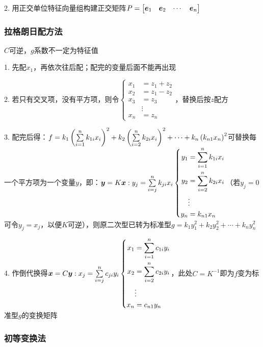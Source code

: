 \documentclass{article}
\begin{document}
2. 用正交单位特征向量组构建正交矩阵$P=\begin{bmatrix}\boldsymbol e_1&\boldsymbol e_2&\cdots&\boldsymbol e_n\end{bmatrix}$

\subsubsection{拉格朗日配方法}

$C$可逆，$g$系数不一定为特征值

1. 先配$x_1$，再依次往后配；配完的变量后面不能再出现

2. 若只有交叉项，没有平方项，则令$\left\{\begin{aligned}
        x_1 & =z_1+z_2 \\
        x_2 & =z_1-z_2 \\
        x_3 & =z_3     \\
            & \vdots   \\
        x_n & =z_n
    \end{aligned}\right.$，替换后按$z$配方

3. 配完后得：$f=k_1\left(\sum\limits_{i=1}^nk_{1i}x_i\right)^2+
    k_2\left(\sum\limits_{i=2}^nk_{2i}x_i\right)^2+\cdots+
    k_n\left(k_{n1}x_n\right)^2$可替换每一个平方项为一个变量$y$，即：$\boldsymbol y=K\boldsymbol x:y_j=\sum\limits_{i=j}^nk_{ji}x_i\left\{\begin{aligned}
        y_1 & =\sum_{i=1}^nk_{1i}x_i \\
        y_2 & =\sum_{i=2}^nk_{2i}x_i \\
            & \vdots                 \\
        y_n & =k_{n1}x_n
    \end{aligned}\right.$（若$y_j=0$可令$y_j=x_j$，以便$K$可逆），则原二次型已转为标准型$g=k_1y_1^2+k_2y_2^2+\cdots+k_ny_n^2$

4. 作倒代换得$\boldsymbol x=C\boldsymbol y:x_j=\sum\limits_{i=j}^nc_{ji}y_i\left\{\begin{aligned}
        x_1 & =\sum_{i=1}^nc_{1i}y_i \\
        x_2 & =\sum_{i=2}^nc_{2i}y_i \\
            & \vdots                 \\
        x_n & =c_{n1}y_n
    \end{aligned}\right.$，此处$C=K^{-1}$即为$f$变为标准型$g$的变换矩阵

\subsubsection{初等变换法}
\end{document}
